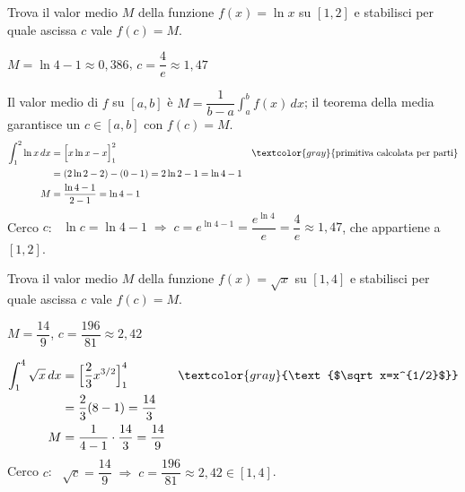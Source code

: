 
\begin{question}[ID=3.1, subtitle={Valor medio di $\ln x$ su $[1,2]$}, tags={integrali, valor medio}, difficulty=media]
Trova il valor medio $M$ della funzione $f(x) = \ln x$ su $[1, 2]$ e stabilisci per quale ascissa $c$ vale $f(c) = M$.
\begin{solution}
$M=\ln4-1\approx0{,}386$, \quad $c=\dfrac4e\approx1{,}47$
\end{solution}
\begin{explanation}
Il valor medio di $f$ su $[a,b]$ è $M=\dfrac{1}{b-a}\displaystyle\int_a^bf(x)\,dx$; il teorema della media garantisce un $c\in[a,b]$ con $f(c)=M$.
\[\begin{aligned}
\int_1^2\ln x\,dx &= \Big[x\ln x-x\Big]_1^2 && \textcolor{gray}{\text{primitiva calcolata per parti}}\\
&= (2\ln2-2)-(0-1)=2\ln2-1=\ln4-1\\
M &= \dfrac{\ln4-1}{2-1}=\ln4-1
\end{aligned}\]
Cerco $c$: \ $\ln c=\ln4-1 \;\Rightarrow\; c=e^{\ln4-1}=\dfrac{e^{\ln4}}{e}=\dfrac4e\approx1{,}47$, che appartiene a $[1,2]$.
\end{explanation}
\end{question}


\begin{question}[ID=3.2, subtitle={Valor medio di $\sqrt{x}$ su $[1,4]$}, tags={integrali, valor medio}, difficulty=media]
Trova il valor medio $M$ della funzione $f(x) = \sqrt{x}$ su $[1, 4]$ e stabilisci per quale ascissa $c$ vale $f(c) = M$.
\begin{solution}
$M=\dfrac{14}{9}$, \quad $c=\dfrac{196}{81}\approx2{,}42$
\end{solution}
\begin{explanation}
\[\begin{aligned}
\int_1^4\sqrt x\,dx &= \Big[\dfrac23x^{3/2}\Big]_1^4 && \textcolor{gray}{\text{$\sqrt x=x^{1/2}$}}\\
&= \dfrac23(8-1)=\dfrac{14}{3}\\
M &= \dfrac{1}{4-1}\cdot\dfrac{14}{3}=\dfrac{14}{9}
\end{aligned}\]
Cerco $c$: \ $\sqrt c=\dfrac{14}{9} \;\Rightarrow\; c=\dfrac{196}{81}\approx2{,}42\in[1,4]$.
\end{explanation}
\end{question}

